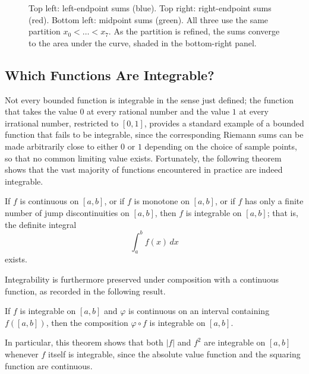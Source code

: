 \begin{figure}[!htbp]
\caption[Riemann sums: left, right, midpoint]{Top left: left-endpoint sums (blue). Top right: right-endpoint sums (red). Bottom left: midpoint sums (green). All three use the same partition $x_0<\dots<x_7$. As the partition is refined, the sums converge to the area under the curve, shaded in the bottom-right panel.}
\label{fig:ch6-riemann-sums}
\end{figure}

\subsection{Which Functions Are Integrable?}

Not every bounded function is integrable in the sense just defined; the function that takes the value $0$ at every rational number and the value $1$ at every irrational number, restricted to $[0,1]$, provides a standard example of a bounded function that fails to be integrable, since the corresponding Riemann sums can be made arbitrarily close to either $0$ or $1$ depending on the choice of sample points, so that no common limiting value exists. Fortunately, the following theorem shows that the vast majority of functions encountered in practice are indeed integrable.

\begin{theorem}
If $f$ is continuous on $[a,b]$, or if $f$ is monotone on $[a,b]$, or if $f$ has only a finite number of jump discontinuities on $[a,b]$, then $f$ is integrable on $[a,b]$; that is, the definite integral
\[
\int_a^b f(x) \, dx
\]
exists.
\end{theorem}

Integrability is furthermore preserved under composition with a continuous function, as recorded in the following result.

\begin{theorem}[Composition]
If $f$ is integrable on $[a,b]$ and $\varphi$ is continuous on an interval containing $f([a,b])$, then the composition $\varphi \circ f$ is integrable on $[a,b]$.
\end{theorem}

In particular, this theorem shows that both $|f|$ and $f^2$ are integrable on $[a,b]$ whenever $f$ itself is integrable, since the absolute value function and the squaring function are continuous.

